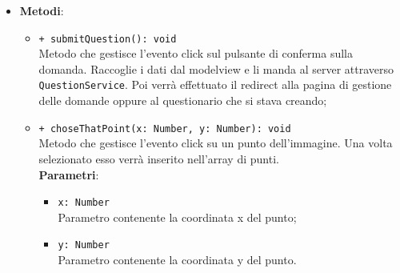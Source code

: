 \begin{itemize}
\begin{itemize}
\begin{itemize}
\begin{itemize}
				\end{itemize}
	\end{itemize}
	\item \textbf{Metodi}:
	\begin{itemize}
			\item \texttt{+ submitQuestion(): void}\\ 
			Metodo che gestisce l’evento click sul pulsante di conferma sulla domanda. Raccoglie i dati dal modelview e li manda al server attraverso \texttt{QuestionService}. Poi verrà effettuato il redirect alla pagina di gestione delle domande oppure al questionario che si stava creando; 
			\item \texttt{+ choseThatPoint(x: Number, y: Number): void}\\
			Metodo che gestisce l’evento click su un punto dell'immagine. Una volta selezionato esso verrà inserito nell'array di punti. \\
			\textbf{Parametri}:
			\begin{itemize}
				\item \texttt{x: Number} \\
				Parametro contenente la coordinata x del punto;
				\item \texttt{y: Number} \\ 
				Parametro contenente la coordinata y del punto.
			\end{itemize}
	\end{itemize}
\end{itemize}
\end{itemize}

